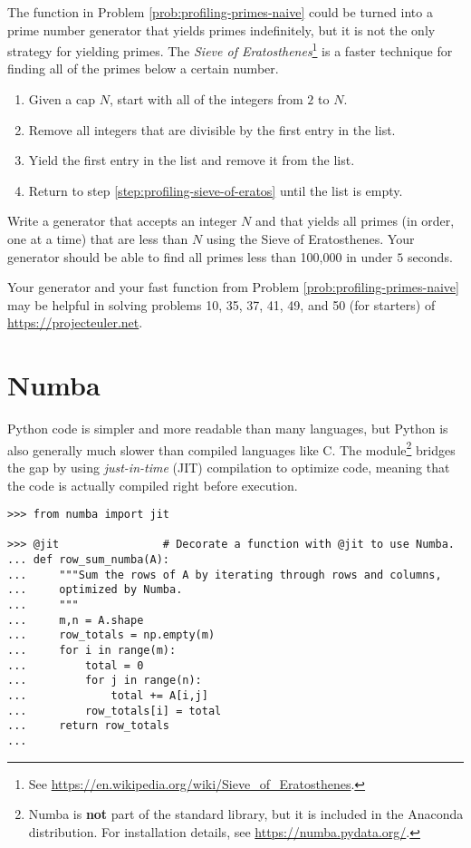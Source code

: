 \begin{problem} %
The function in Problem \ref{prob:profiling-primes-naive} could be turned into a prime number generator that yields primes indefinitely, but it is not the only strategy for yielding primes.
The \emph{Sieve of Eratosthenes}\footnote{See \url{https://en.wikipedia.org/wiki/Sieve_of_Eratosthenes}.} is a faster technique for finding all of the primes below a certain number.
\begin{enumerate}
\item Given a cap $N$, start with all of the integers from $2$ to $N$.
\item Remove all integers that are divisible by the first entry in the list. \label{step:profiling-sieve-of-eratos}
\item Yield the first entry in the list and remove it from the list.
\item Return to step \ref{step:profiling-sieve-of-eratos} until the list is empty.
\end{enumerate}

Write a generator that accepts an integer $N$ and that yields all primes (in order, one at a time) that are less than $N$ using the Sieve of Eratosthenes.
Your generator should be able to find all primes less than 100,000 in under $5$ seconds.

Your generator and your fast function from Problem \ref{prob:profiling-primes-naive} may be helpful in solving problems 10, 35, 37, 41, 49, and 50 (for starters) of \url{https://projecteuler.net}.
\end{problem}

\section*{Numba} %

Python code is simpler and more readable than many languages, but Python is also generally much slower than compiled languages like C.
The  module\footnote{Numba is \textbf{not} part of the standard library, but it is included in the Anaconda distribution. For installation details, see \url{https://numba.pydata.org/}.} bridges the gap by using \emph{just-in-time} (JIT) compilation to optimize code, meaning that the code is actually compiled right before execution.

\begin{lstlisting}
>>> from numba import jit

>>> @jit                # Decorate a function with @jit to use Numba.
... def row_sum_numba(A):
...     """Sum the rows of A by iterating through rows and columns,
...     optimized by Numba.
...     """
...     m,n = A.shape
...     row_totals = np.empty(m)
...     for i in range(m):
...         total = 0
...         for j in range(n):
...             total += A[i,j]
...         row_totals[i] = total
...     return row_totals
...
\end{lstlisting}

